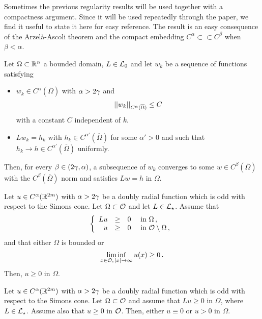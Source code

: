 Sometimes the previous regularity results will be used together with a compactness argument. Since
it will be used repeatedly through the paper, we find it useful to state it here for easy
reference. The result is an easy consequence of the Arzelà-Ascoli theorem and the compact embedding
$C^\alpha \subset \subset C^\beta$ when $\beta < \alpha$.

\begin{lemma}
\label{Lemma:CompactnessLemma} Let $\Omega\subset \mathbb{R}^n$ a bounded domain, $L\in \mathcal{L}_0$ and let
$w_k$ be a sequence of functions satisfying
\begin{itemize}
\item $w_k \in C^\alpha (\overline{\Omega})$ with $\alpha > 2\gamma$ and
$$
\left | \left |{w_k} \right | \right |_{C^\alpha (\overline{\Omega})} \leq C
$$
with a constant $C$ independent of $k$.
\item $L w_k = h_k$ with $h_k \in C^{\alpha'}(\overline{\Omega})$ for some $\alpha' > 0$ and such
    that $h_k \to h \in C^{\alpha'}(\overline{\Omega})$ uniformly.
\end{itemize}
Then, for every $\beta \in (2\gamma, \alpha)$, a subsequence of $w_k$ converges to some $w \in C^\beta
(\overline{\Omega})$ with the $C^\beta (\overline{\Omega})$ norm and satisfies $Lw = h$ in
$\Omega$.
\end{lemma}



\begin{proposition}
\label{Prop:WeakMaximumPrincipleForOddFunctions} Let $u\in C^{\alpha}(\mathbb{R}^{2m})$ with
$\alpha > 2\gamma$ be a doubly radial function which is odd with respect to the Simons cone. Let
$\Omega \subset \mathcal{O}$ and let $L \in \mathcal{L}_\star$. Assume that
$$
\left\{\begin{array}{rcll}
Lu & \geq & 0 & \text{ in } \Omega\,,\\
u & \geq & 0 & \text{ in } \mathcal{O} \setminus \Omega\,,
\end{array} \right.
$$
and that either $\Omega$ is bounded or 
$$
\liminf_{x \in \mathcal{O},\,|x|\to \infty} u(x) \geq 0\,.
$$
Then, $u \geq 0$ in $\Omega$.
\end{proposition}


\begin{proposition}
\label{Prop:StrongMaximumPrincipleForOddFunctions} Let $u\in C^{\alpha}(\mathbb{R}^{2m})$ with
$\alpha > 2\gamma$ be a doubly radial function which is odd with respect to the Simons cone.  Let
$\Omega \subset \mathcal{O}$ and assume that $Lu \geq 0$ in $\Omega$, where $L \in \mathcal{L}_\star$. Assume also that $u\geq 0$ in $\mathcal{O}$.
Then, either $u\equiv 0$ or $u > 0$ in $\Omega$.
\end{proposition}

